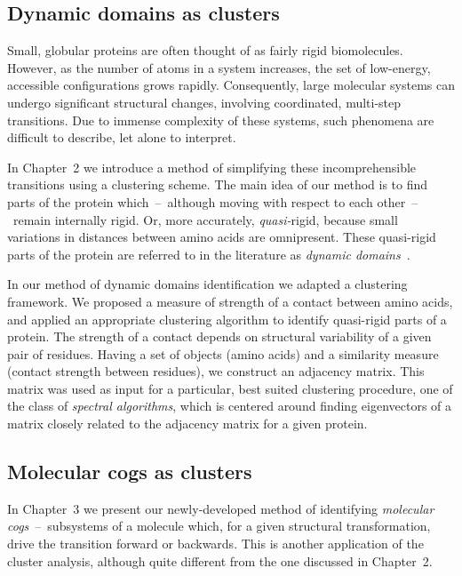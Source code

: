 \documentclass[a4paper,11pt,twoside]{book}%
\begin{document}
\subsection{Dynamic domains as clusters}

Small, globular proteins are often thought of as fairly rigid biomolecules.
However, as the number of atoms in a system increases, the set of low-energy, accessible configurations grows rapidly.
Consequently, large molecular systems can undergo significant structural changes, involving coordinated, multi-step transitions.
Due to immense complexity of these systems, such phenomena are difficult to describe, let alone to interpret.

In Chapter~2 we introduce a method of simplifying these incomprehensible transitions using a clustering scheme.
The main idea of our method is to find parts of the protein which~--~although moving with respect to each other~--~remain internally rigid.
Or, more accurately, \emph{quasi-}rigid, because small variations in distances between amino acids are omnipresent.
These quasi-rigid parts of the protein are referred to in the literature as \emph{dynamic domains}~\cite{bahar1997direct,hayward1998systematic,hinsen1998analysis}.

In our method of dynamic domains identification we adapted a clustering framework.
We proposed a measure of strength of a contact between amino acids, and applied an appropriate clustering algorithm to identify quasi-rigid parts of a protein.
The strength of a contact depends on structural variability of a given pair of residues.
Having a set of objects (amino acids) and a similarity measure (contact strength between residues), we construct an adjacency matrix.
This matrix was used as input for a particular, best suited clustering procedure, one of the class of \emph{spectral algorithms}, which is centered around finding eigenvectors of a matrix closely related to the adjacency matrix for a given protein.

\subsection{Molecular cogs as clusters}

In Chapter~3 we present our newly-developed method of identifying \emph{molecular cogs}~--~subsystems of a molecule which, for a given structural transformation, drive the transition forward or backwards.
This is another application of the cluster analysis, although quite different from the one discussed in Chapter~2.
\end{document}
